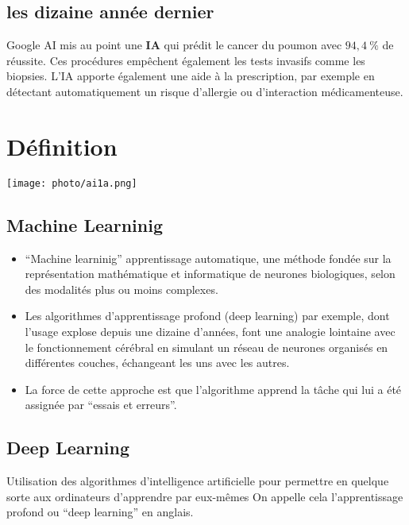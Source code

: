 \subsection{les dizaine année dernier}
    Google AI mis au point une \textbf{IA} qui prédit le cancer du poumon avec
    $94,4~\%$ de réussite. Ces procédures empêchent également les tests invasifs comme les biopsies.
    L'IA apporte également une aide à la prescription, par exemple
    en détectant automatiquement un risque d'allergie ou
    d'interaction médicamenteuse.

\section{Définition}
{
\texttt{[image: photo/ai1a.png]}
}


\subsection{Machine Learninig}
\begin{itemize}
    \item
    ``Machine learninig'' apprentissage automatique, une méthode fondée sur
    la représentation mathématique et informatique de neurones
    biologiques, selon des modalités plus ou moins complexes.

    \item
    Les algorithmes d'apprentissage profond (deep learning) par exemple, dont
    l'usage explose depuis une dizaine d'années, font une analogie
    lointaine avec le fonctionnement cérébral en simulant un réseau de
    neurones organisés en différentes couches, échangeant les uns avec les
    autres.

    \item
    La force de cette approche est que l'algorithme apprend la
    tâche qui lui a été assignée par ``essais et erreurs''.
\end{itemize}
\subsection{Deep Learning}
    Utilisation des algorithmes d'intelligence artificielle pour permettre
    en quelque sorte aux ordinateurs d'apprendre par eux-mêmes On
    appelle cela l'apprentissage profond ou ``deep learning'' en anglais.

